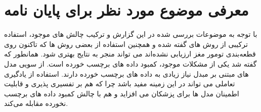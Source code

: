 \section{معرفی موضوع مورد نظر برای پایان نامه}
با توجه به موضوعات بررسی شده در این گزارش و ترکیب چالش های موجود، استفاده ترکیبی از روش های گفته شده و همچنین استفاده از بعضی روش ها که تاکنون روی قطعه‌بندی تومور مغز ارزیابی نشده‌اند می تواند منجر به نتایج بهتری شود. همانطور که گفته شد یکی از مشکلات موجود، کمبود داده های برچسب خورده است. از سویی مدل های مبتنی بر مبدل نیاز زیادی به داده های برچسب خورده دارند. استفاده از یادگیری تعاملی می تواند در این زمینه مفید باشد چرا که هم بر تفسیری پذیری و قابلیت اطمینان مدل ها برای پزشکان می افزاید و هم با چالش کمبود داده های برچسب نخورده مقابله می‌کند.